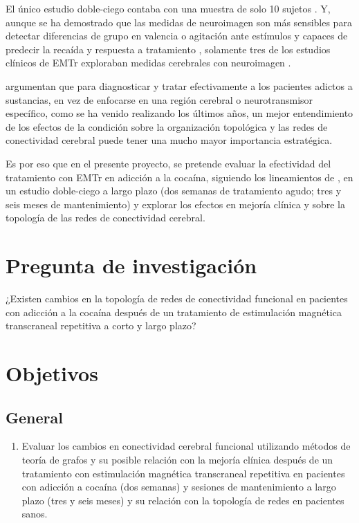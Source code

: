 El único estudio doble-ciego contaba con una muestra de solo 10 sujetos \parencite{Bolloni2016}.
Y, aunque se ha demostrado que las medidas de neuroimagen son más sensibles para detectar diferencias de grupo en valencia o agitación ante estímulos \parencite{Goldstein2012a} y capaces de predecir la recaída y respuesta a tratamiento \parencite{Suckling2017}, solamente tres de los estudios clínicos de EMTr exploraban medidas cerebrales con neuroimagen \parencite{Kearney-Ramos2018a, Kearney-Ramos2019, Hanlon2015}. \par
\textcite{Steele2018} argumentan que para diagnosticar y tratar efectivamente a los pacientes adictos a sustancias, en vez de enfocarse en una región cerebral o neurotransmisor específico, como se ha venido realizando los últimos años, un mejor entendimiento de los efectos de la condición sobre la organización topológica y las redes de conectividad cerebral puede tener una mucho mayor importancia estratégica. \par
Es por eso que en el presente proyecto, se pretende evaluar la efectividad del tratamiento con EMTr en adicción a la cocaína, siguiendo los lineamientos de \textcite{Ekhtiari2019}, en un estudio doble-ciego a largo plazo (dos semanas de tratamiento agudo; tres y seis meses de mantenimiento) y explorar los efectos en mejoría clínica y sobre la topología de las redes de conectividad cerebral.

\section{Pregunta de investigación}
¿Existen cambios en la topología de redes de conectividad funcional en pacientes con adicción a la cocaína después de un tratamiento de estimulación magnética transcraneal repetitiva a corto y largo plazo?

\section{Objetivos}
\subsection{General}
\begin{enumerate}[label=General., left= \parindent]
    \item Evaluar los cambios en conectividad cerebral funcional utilizando métodos de teoría de grafos y su posible relación con la mejoría clínica después de un tratamiento con estimulación magnética transcraneal repetitiva en pacientes con adicción a cocaína (dos semanas) y sesiones de mantenimiento a largo plazo (tres y seis meses) y su relación con la topología de redes en pacientes sanos.
\end{enumerate}
